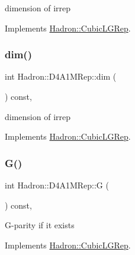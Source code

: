dimension of irrep 

Implements \mbox{\hyperlink{structHadron_1_1CubicLGRep_a3acbaea26503ed64f20df693a48e4cdd}{Hadron\+::\+Cubic\+L\+G\+Rep}}.

\mbox{\label{structHadron_1_1D4A1MRep_ae14f6a295b89553d56114e5727e631da}} 
\subsubsection{\texorpdfstring{dim()}{dim()}\hspace{0.1cm}{\footnotesize\ttfamily [3/3]}}
{\footnotesize\ttfamily int Hadron\+::\+D4\+A1\+M\+Rep\+::dim (\begin{DoxyParamCaption}{ }\end{DoxyParamCaption}) const\hspace{0.3cm}{\ttfamily [inline]}, {\ttfamily [virtual]}}

dimension of irrep 

Implements \mbox{\hyperlink{structHadron_1_1CubicLGRep_a3acbaea26503ed64f20df693a48e4cdd}{Hadron\+::\+Cubic\+L\+G\+Rep}}.

\mbox{\label{structHadron_1_1D4A1MRep_af3514ad54f3b71a3e233360843f8d189}} 
\subsubsection{\texorpdfstring{G()}{G()}\hspace{0.1cm}{\footnotesize\ttfamily [1/3]}}
{\footnotesize\ttfamily int Hadron\+::\+D4\+A1\+M\+Rep\+::G (\begin{DoxyParamCaption}{ }\end{DoxyParamCaption}) const\hspace{0.3cm}{\ttfamily [inline]}, {\ttfamily [virtual]}}

G-\/parity if it exists 

Implements \mbox{\hyperlink{structHadron_1_1CubicLGRep_ace26f7b2d55e3a668a14cb9026da5231}{Hadron\+::\+Cubic\+L\+G\+Rep}}.

\mbox{\label{structHadron_1_1D4A1MRep_af3514ad54f3b71a3e233360843f8d189}} 
